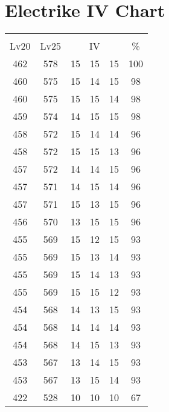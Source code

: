 \documentclass{article}%
\begin{document}
%
\normalsize%
\section{Electrike IV Chart}%
\label{sec:Electrike IV Chart}%
\renewcommand{\arraystretch}{1.5}%
\begin{tabular}{|c|c|c|c|c|c|}%
\hline%
\multicolumn{6}{|c|}{\textcolor{white}{ 
\linebreak{Electrike}
}%
\cellcolor{black}}\\%
\multicolumn{1}{|c}{Lv20}&\multicolumn{1}{c|}{Lv25}&\multicolumn{3}{c|}{IV}&\multicolumn{1}{|c|}{\%}\\%
\hline%
\rowcolor{color100}%
462&578&15&15&15&100\\%
\hline%
\rowcolor{color98}%
460&575&15&14&15&98\\%
\hline%
\rowcolor{color98}%
460&575&15&15&14&98\\%
\hline%
\rowcolor{color98}%
459&574&14&15&15&98\\%
\hline%
\rowcolor{color96}%
458&572&15&14&14&96\\%
\hline%
\rowcolor{color96}%
458&572&15&15&13&96\\%
\hline%
\rowcolor{color96}%
457&572&14&14&15&96\\%
\hline%
\rowcolor{color96}%
457&571&14&15&14&96\\%
\hline%
\rowcolor{color96}%
457&571&15&13&15&96\\%
\hline%
\rowcolor{color96}%
456&570&13&15&15&96\\%
\hline%
\rowcolor{color93}%
455&569&15&12&15&93\\%
\hline%
\rowcolor{color93}%
455&569&15&13&14&93\\%
\hline%
\rowcolor{color93}%
455&569&15&14&13&93\\%
\hline%
\rowcolor{color93}%
455&569&15&15&12&93\\%
\hline%
\rowcolor{color93}%
454&568&14&13&15&93\\%
\hline%
\rowcolor{color93}%
454&568&14&14&14&93\\%
\hline%
\rowcolor{color93}%
454&568&14&15&13&93\\%
\hline%
\rowcolor{color93}%
453&567&13&14&15&93\\%
\hline%
\rowcolor{color93}%
453&567&13&15&14&93\\%
\hline%
\rowcolor{color91}%
422&528&10&10&10&67\\%
\end{tabular}

%
\end{document}
